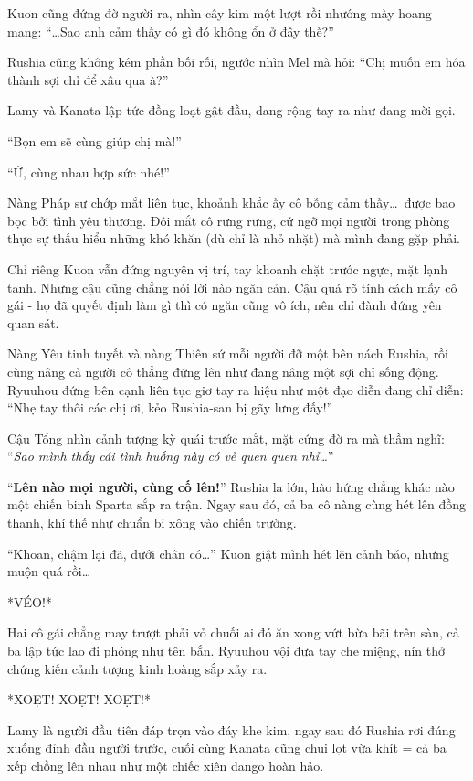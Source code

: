 \documentclass[../main.tex]{subfiles}
\begin{document}
Kuon cũng đứng đờ người ra, nhìn cây kim một lượt rồi nhướng mày hoang mang: ``\dots Sao anh cảm thấy có gì đó không ổn ở đây thế?''

Rushia cũng không kém phần bối rối, ngước nhìn Mel mà hỏi: ``Chị muốn em hóa thành sợi chỉ để xâu qua à?''

Lamy và Kanata lập tức đồng loạt gật đầu, dang rộng tay ra như đang mời gọi.

``Bọn em sẽ cùng giúp chị mà!''

``Ừ, cùng nhau hợp sức nhé!''

Nàng Pháp sư chớp mắt liên tục, khoảnh khắc ấy cô bỗng cảm thấy\dots\ được bao bọc bởi tình yêu thương. Đôi mắt cô rưng rưng, cứ ngỡ mọi người trong phòng thực sự thấu hiểu những khó khăn (dù chỉ là nhỏ nhặt) mà mình đang gặp phải.

Chỉ riêng Kuon vẫn đứng nguyên vị trí, tay khoanh chặt trước ngực, mặt lạnh tanh. Nhưng cậu cũng chẳng nói lời nào ngăn cản. Cậu quá rõ tính cách mấy cô gái - họ đã quyết định làm gì thì có ngăn cũng vô ích, nên chỉ đành đứng yên quan sát.

Nàng Yêu tinh tuyết và nàng Thiên sứ mỗi người đỡ một bên nách Rushia, rồi cùng nâng cả người cô thẳng đứng lên như đang nâng một sợi chỉ sống động. Ryuuhou đứng bên cạnh liên tục giơ tay ra hiệu như một đạo diễn đang chỉ diễn: ``Nhẹ tay thôi các chị ơi, kẻo Rushia-san bị gãy lưng đấy!''

Cậu Tổng nhìn cảnh tượng kỳ quái trước mắt, mặt cứng đờ ra mà thầm nghĩ: ``\textit{Sao mình thấy cái tình huống này có vẻ quen quen nhỉ\dots}''


``\textbf{Lên nào mọi người, cùng cố lên!}'' Rushia la lớn, hào hứng chẳng khác nào một chiến binh Sparta sắp ra trận. Ngay sau đó, cả ba cô nàng cùng hét lên đồng thanh, khí thế như chuẩn bị xông vào chiến trường.

``Khoan, chậm lại đã, dưới chân có\dots'' Kuon giật mình hét lên cảnh báo, nhưng muộn quá rồi\dots

*VÉO!*

Hai cô gái chẳng may trượt phải vỏ chuối ai đó ăn xong vứt bừa bãi trên sàn, cả ba lập tức lao đi phóng như tên bắn. Ryuuhou vội đưa tay che miệng, nín thở chứng kiến cảnh tượng kinh hoàng sắp xảy ra.

*XOẸT! XOẸT! XOẸT!*


Lamy là người đầu tiên đáp trọn vào đáy khe kim, ngay sau đó Rushia rơi đúng xuống đỉnh đầu người trước, cuối cùng Kanata cũng chui lọt vừa khít = cả ba xếp chồng lên nhau như một chiếc xiên dango hoàn hảo.
\end{document}
